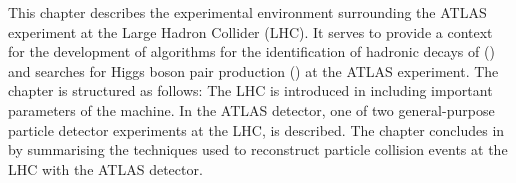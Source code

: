 This chapter describes the experimental environment surrounding the ATLAS
experiment at the Large Hadron Collider (LHC). It serves to provide a context
for the development of algorithms for the identification of hadronic decays of
\tauleptons () and searches for Higgs boson pair production
() at the ATLAS experiment. The
chapter is structured as follows: The LHC is introduced in 
including important parameters of the machine. In  the ATLAS
detector, one of two general-purpose particle detector experiments at the LHC,
is described. The chapter concludes in  by
summarising the techniques used to reconstruct particle collision events at the
LHC with the ATLAS detector.

